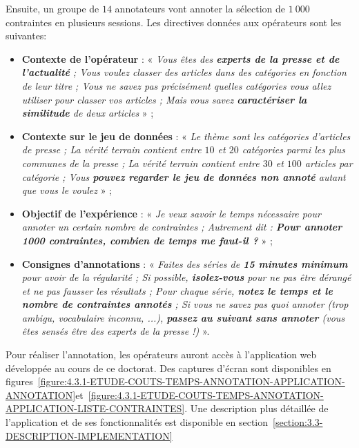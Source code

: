 			Ensuite, un groupe de $14$ annotateurs vont annoter la sélection de $1~000$ contraintes en plusieurs sessions.
			Les directives données aux opérateurs sont les suivantes:
			\begin{itemize}
				\item \textbf{Contexte de l'opérateur} :
				« \textit{Vous êtes des \textbf{experts de la presse et de l’actualité} ; Vous voulez classer des articles dans des catégories en fonction de leur titre ; Vous ne savez pas précisément quelles catégories vous allez utiliser pour classer vos articles ; Mais vous savez \textbf{caractériser la similitude} de deux articles} » ;
				\item \textbf{Contexte sur le jeu de données} :
				« \textit{Le thème sont les catégories d’articles de presse ; La vérité terrain contient entre $10$ et $20$ catégories parmi les plus communes de la presse ; La vérité terrain contient entre $30$ et $100$ articles par catégorie ; Vous \textbf{pouvez regarder le jeu de données non annoté} autant que vous le voulez} » ;
				\item \textbf{Objectif de l'expérience} :
				« \textit{Je veux savoir le temps nécessaire pour annoter un certain nombre de contraintes ; Autrement dit : \textbf{Pour annoter 1000 contraintes, combien de temps me faut-il ?}} » ;
				\item \textbf{Consignes d'annotations} :
				« \textit{Faites des séries de \textbf{15 minutes minimum} pour avoir de la régularité ; Si possible, \textbf{isolez-vous} pour ne pas être dérangé et ne pas fausser les résultats ; Pour chaque série, \textbf{notez le temps et le nombre de contraintes annotés} ; Si vous ne savez pas quoi annoter (trop ambigu, vocabulaire inconnu, ...), \textbf{passez au suivant sans annoter} (vous êtes sensés être des experts de la presse !)} ».
			\end{itemize}
			Pour réaliser l'annotation, les opérateurs auront accès à l'application web développée au cours de ce doctorat.
			Des captures d'écran sont disponibles en figures~\ref{figure:4.3.1-ETUDE-COUTS-TEMPS-ANNOTATION-APPLICATION-ANNOTATION}et~\ref{figure:4.3.1-ETUDE-COUTS-TEMPS-ANNOTATION-APPLICATION-LISTE-CONTRAINTES}.
			Une description plus détaillée de l'application et de ses fonctionnalités est disponible en section~\ref{section:3.3-DESCRIPTION-IMPLEMENTATION}
